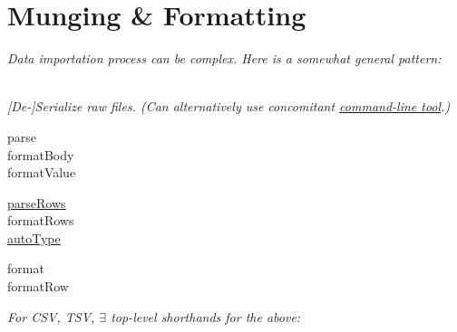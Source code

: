 \section{Munging \& Formatting}

\textit{Data importation process can be complex. Here is a somewhat general pattern:}\\
\resizebox{6.5cm}{!}{} \\



\textit{[De-]Serialize raw files. (Can alternatively use concomitant \href{https://github.com/d3/d3-dsv\#command-line-reference}{command-line tool}.)}


{\footnotesize 
\begin{minipage}[t]{2.0cm}
    parse\\
    formatBody\\
    formatValue
\end{minipage}
\begin{minipage}[t]{2.0cm}
    \href{https://observablehq.com/@d3/parse-csv-with-duplicate-column-names}{parseRows}\\
    formatRows\\
    \href{https://observablehq.com/@d3/d3-autotype}{autoType}
\end{minipage}
\begin{minipage}[t]{2.0cm}
    format\\
    formatRow\\
\end{minipage}
}



\textit{For CSV, TSV, $\exists$ top-level shorthands for the above:}%
\\
\\
\\
\\


